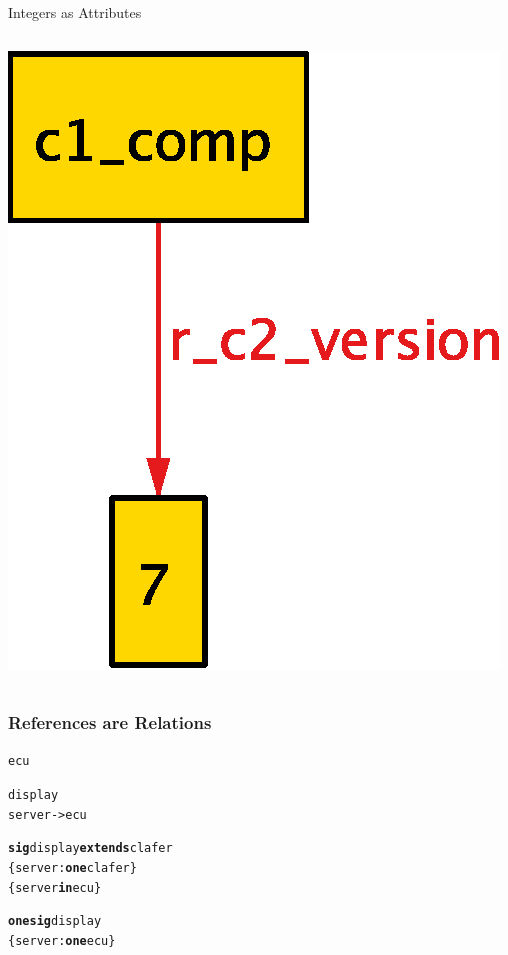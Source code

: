 \documentclass[table,15pt,t]{beamer}
\newcounter{i}
\begin{document}
\begin{frame}{Integers as Attributes}
\begin{columns}
\begin{column}{0.5\textwidth}
      \includegraphics[scale=0.5]{figs/integer-new}
    \end{column}
  \end{columns}
\end{frame}

\begin{frame}[fragile]
  \frametitle{References are Relations}
  \begin{alltt}
    \begin{small}
\textsf{ecu}
      
\textsf{display}
  \textsf{server} -> \textsf{ecu}
\pause

\textbf{sig} \textsf{display} \textbf{extends} \textsf{clafer}
\{ \textsf{server} : \textbf{one} \textsf{clafer} \}
\{ \textsf{server} \textbf{in} \textsf{ecu} \}

\pause
\textbf{one sig} \textsf{display}
\{ \textsf{server} : \textbf{one} \textsf{ecu} \}
    \end{small}
  \end{alltt}

\end{frame}
\end{document}
